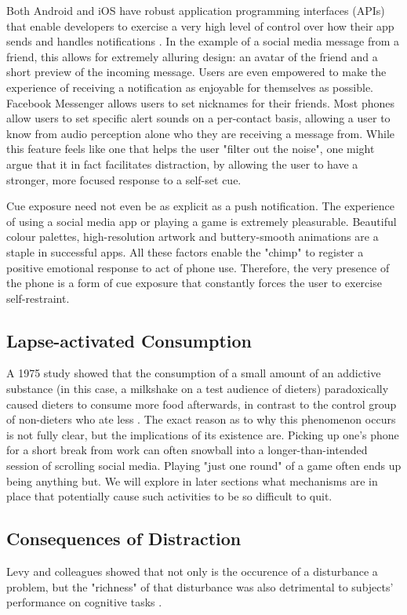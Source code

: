Both Android and iOS have robust application programming interfaces (APIs) that enable developers to exercise a very high level of control over how their app sends and handles notifications \cite{androidnotification}. In the example of a social media message from a friend, this allows for extremely alluring design: an avatar of the friend and a short preview of the incoming message. Users are even empowered to make the experience of receiving a notification as enjoyable for themselves as possible. Facebook Messenger allows users to set nicknames for their friends. Most phones allow users to set specific alert sounds on a per-contact basis, allowing a user to know from audio perception alone who they are receiving a message from. While this feature feels like one that helps the user "filter out the noise", one might argue that it in fact facilitates distraction, by allowing the user to have a stronger, more focused response to a self-set cue.

Cue exposure need not even be as explicit as a push notification. The experience of using a social media app or playing a game is extremely pleasurable. Beautiful colour palettes, high-resolution artwork and buttery-smooth animations are a staple in successful apps. All these factors enable the "chimp" to register a positive emotional response to act of phone use. Therefore, the very presence of the phone is a form of cue exposure that constantly forces the user to exercise self-restraint.

\subsection{Lapse-activated Consumption}
A 1975 study showed that the consumption of a small amount of an addictive substance (in this case, a milkshake on a test audience of dieters) paradoxically caused dieters to consume more food afterwards, in contrast to the control group of non-dieters who ate less \cite{herman1975restrained}. The exact reason as to why this phenomenon occurs is not fully clear, but the implications of its existence are. Picking up one's phone for a short break from work can often snowball into a longer-than-intended session of scrolling social media. Playing "just one round" of a game often ends up being anything but. We will explore in later sections what mechanisms are in place that potentially cause such activities to be so difficult to quit.

\subsection{Consequences of Distraction}
Levy and colleagues showed that not only is the occurence of a disturbance a problem, but the "richness" of that disturbance was also detrimental to subjects' performance on cognitive tasks \cite{levy2016effect}.


